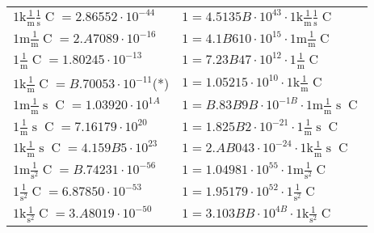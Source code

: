 \begin{center}
\begin{longtable}{l l}
{\color{gray}$1 \bm{\mathrm{ k}}\frac1{\operatorname{m}}\frac1{\operatorname{s}}{\operatorname{C}}{} = 2.86552\cdot10^{-44} $}   & {\color{gray}$ 1 = 4.5135B\cdot10^{43} \cdot 1 \bm{\mathrm{ k}}\frac1{\operatorname{m}}\frac1{\operatorname{s}}{\operatorname{C}}{}$}  \\
{\color{gray}$1 \bm{\mathrm{ m}}\frac1{\operatorname{m}}{}{\operatorname{C}}{} = 2.A7089\cdot10^{-16} $}   & {\color{gray}$ 1 = 4.1B610\cdot10^{15} \cdot 1 \bm{\mathrm{ m}}\frac1{\operatorname{m}}{}{\operatorname{C}}{}$}  \\
{\color{black}$1 \bm{\mathrm{ }}\frac1{\operatorname{m}}{}{\operatorname{C}}{} = 1.80245\cdot10^{-13} $}   & {\color{black}$ 1 = 7.23B47\cdot10^{12} \cdot 1 \bm{\mathrm{ }}\frac1{\operatorname{m}}{}{\operatorname{C}}{}$}  \\
{\color{gray}$1 \bm{\mathrm{ k}}\frac1{\operatorname{m}}{}{\operatorname{C}}{} = B.70053\cdot10^{-11} $}\quad(*) & {\color{gray}$ 1 = 1.05215\cdot10^{10} \cdot 1 \bm{\mathrm{ k}}\frac1{\operatorname{m}}{}{\operatorname{C}}{}$}  \\
{\color{gray}$1 \bm{\mathrm{ m}}\frac1{\operatorname{m}}{\operatorname{s}}{\operatorname{C}}{} = 1.03920\cdot10^{1A} $}   & {\color{gray}$ 1 = B.83B9B\cdot10^{-1B} \cdot 1 \bm{\mathrm{ m}}\frac1{\operatorname{m}}{\operatorname{s}}{\operatorname{C}}{}$}  \\
{\color{black}$1 \bm{\mathrm{ }}\frac1{\operatorname{m}}{\operatorname{s}}{\operatorname{C}}{} = 7.16179\cdot10^{20} $}   & {\color{black}$ 1 = 1.825B2\cdot10^{-21} \cdot 1 \bm{\mathrm{ }}\frac1{\operatorname{m}}{\operatorname{s}}{\operatorname{C}}{}$}  \\
{\color{gray}$1 \bm{\mathrm{ k}}\frac1{\operatorname{m}}{\operatorname{s}}{\operatorname{C}}{} = 4.159B5\cdot10^{23} $}   & {\color{gray}$ 1 = 2.AB043\cdot10^{-24} \cdot 1 \bm{\mathrm{ k}}\frac1{\operatorname{m}}{\operatorname{s}}{\operatorname{C}}{}$}  \\
{\color{gray}$1 \bm{\mathrm{ m}}{}\frac1{\operatorname{s}^2}{\operatorname{C}}{} = B.74231\cdot10^{-56} $}   & {\color{gray}$ 1 = 1.04981\cdot10^{55} \cdot 1 \bm{\mathrm{ m}}{}\frac1{\operatorname{s}^2}{\operatorname{C}}{}$}  \\
{\color{black}$1 \bm{\mathrm{ }}{}\frac1{\operatorname{s}^2}{\operatorname{C}}{} = 6.87850\cdot10^{-53} $}   & {\color{black}$ 1 = 1.95179\cdot10^{52} \cdot 1 \bm{\mathrm{ }}{}\frac1{\operatorname{s}^2}{\operatorname{C}}{}$}  \\
{\color{gray}$1 \bm{\mathrm{ k}}{}\frac1{\operatorname{s}^2}{\operatorname{C}}{} = 3.A8019\cdot10^{-50} $}   & {\color{gray}$ 1 = 3.103BB\cdot10^{4B} \cdot 1 \bm{\mathrm{ k}}{}\frac1{\operatorname{s}^2}{\operatorname{C}}{}$}  \\

\end{longtable}
\end{center}
